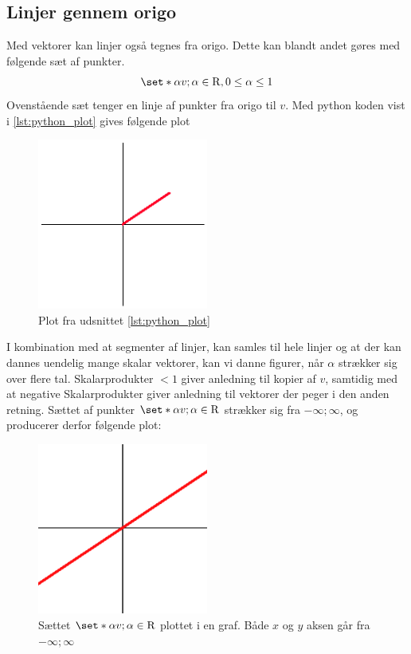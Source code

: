 \subsection{Linjer gennem origo}
Med vektorer kan linjer også tegnes fra origo.
Dette kan blandt andet gøres med følgende sæt af punkter.
\begin{equation}
	\label{eqn:origo}
	\set*{\alpha v; \alpha\in\mathrm{R},0\leq\alpha\leq1}
\end{equation}
Ovenstående sæt tenger en linje af punkter fra origo til $v$.
Med python koden vist i \cref{lst:python_plot} gives følgende plot
\begin{figure}[h]
	\centering
	\includegraphics[width=0.5\textwidth]{img/vecplot.png}
	\caption{Plot fra udsnittet \cref{lst:python_plot}}
	\label{fig:plot_line}
\end{figure}


I kombination med at segmenter af linjer, kan samles til hele linjer og at der kan dannes uendelig mange skalar vektorer, kan vi danne figurer, når $\alpha$ strækker sig over flere tal.
Skalarprodukter $<1$ giver anledning til kopier af $v$, samtidig med at negative Skalarprodukter giver anledning til vektorer der peger i den anden retning.
Sættet af punkter $\set*{\alpha v;\alpha\in \mathrm{R}}$ strækker sig fra $-\infty;\infty$, og producerer derfor følgende plot:
\begin{figure}[h]
	\centering
	\includegraphics[width=0.5\textwidth]{img/thrh_origin.png}
	\caption{Sættet $\set*{\alpha v;\alpha\in \mathrm{R}}$ plottet i en graf.
	Både $x$ og $y$ aksen går fra $-\infty;\infty$}
	\label{fig:plot_through}
\end{figure}

